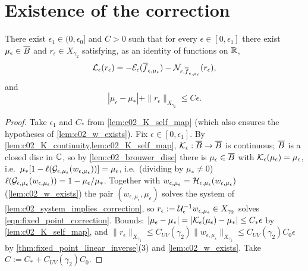 \section{Existence of the correction}

\begin{theorem}
  \label{thm:fixed_point_correction}
  There exist $\epsilon_1\in(0,\epsilon_0]$ and $C>0$ such that for every $\epsilon\in[0,\epsilon_1]$ there exist
  $\mu_\epsilon\in\overline{B}$ and $r_\epsilon\in X_{\gamma_2}$ satisfying, as an identity of functions on $\mathbb{R}$,
  \begin{equation}\label{eqn:fixed_point_correction}
    \mathcal{L}_\epsilon(r_\epsilon)=-\mathcal{E}_\epsilon(\overline{f}_{\epsilon,\mu_\epsilon})-\mathcal{N}_{\epsilon,\overline{f}_{\epsilon,\mu_\epsilon}}(r_\epsilon),
  \end{equation}
  and
  \begin{equation}\label{eqn:fixed_point_correction_bound}
    |\mu_\epsilon-\mu_*|+\|r_\epsilon\|_{X_{\gamma_2}}\le C\epsilon .
  \end{equation}
\end{theorem}
\begin{proof}
  Take $\epsilon_1$ and $C_*$ from \cref{lem:c02_K_self_map} (which also ensures the hypotheses of
  \cref{lem:c02_w_exists}). Fix $\epsilon\in[0,\epsilon_1]$. By \cref{lem:c02_K_continuity,lem:c02_K_self_map},
  $\mathcal{K}_\epsilon:\overline{B}\to\overline{B}$ is continuous; $\overline{B}$ is a closed disc in $\mathbb{C}$, so by
  \cref{lem:c02_brouwer_disc} there is $\mu_\epsilon\in\overline{B}$ with $\mathcal{K}_\epsilon(\mu_\epsilon)=\mu_\epsilon$, i.e.\
  $\mu_*[1-\ell(\mathcal{G}_{\epsilon,\mu_\epsilon}(w_{\epsilon,\mu_\epsilon}))]=\mu_\epsilon$, i.e.\ (dividing by $\mu_*\ne0$)
  $\ell(\mathcal{G}_{\epsilon,\mu_\epsilon}(w_{\epsilon,\mu_\epsilon}))=1-\mu_\epsilon/\mu_*$. Together with
  $w_{\epsilon,\mu_\epsilon}=\mathcal{H}_{\epsilon,\mu_\epsilon}(w_{\epsilon,\mu_\epsilon})$ (\cref{lem:c02_w_exists}) the pair
  $(w_{\epsilon,\mu_\epsilon},\mu_\epsilon)$ solves the system of \cref{lem:c02_system_implies_correction}, so
  $r_\epsilon:=\mathcal{U}_\epsilon^{-1}w_{\epsilon,\mu_\epsilon}\in X_{\gamma_2}$ solves \eqref{eqn:fixed_point_correction}.
  Bounds: $|\mu_\epsilon-\mu_*|=|\mathcal{K}_\epsilon(\mu_\epsilon)-\mu_*|\le C_*\epsilon$ by \cref{lem:c02_K_self_map}, and
  $\|r_\epsilon\|_{X_{\gamma_2}}\le C_{UV}(\gamma_2)\|w_{\epsilon,\mu_\epsilon}\|_{X_{\gamma_2}}\le C_{UV}(\gamma_2)C_0\epsilon$ by
  \cref{thm:fixed_point_linear_inverse}(3) and \cref{lem:c02_w_exists}. Take $C:=C_*+C_{UV}(\gamma_2)C_0$.
\end{proof}

